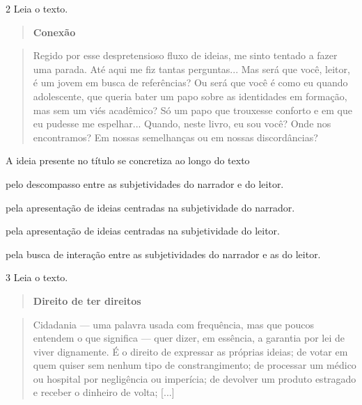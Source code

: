 \pagebreak

\num{2} Leia o texto.

\begin{quote}
\centering\textbf{Conexão}
\end{quote}


\begin{quote}
Regido por esse despretensioso fluxo de ideias, me sinto tentado a fazer
uma parada. Até aqui me fiz tantas perguntas... Mas será que você,
leitor, é um jovem em busca de referências? Ou será que você é como eu
quando adolescente, que queria bater um papo sobre as identidades em
formação, mas sem um viés acadêmico? Só um papo que trouxesse conforto e
em que eu pudesse me espelhar... Quando, neste livro, eu sou você? Onde
nos encontramos? Em nossas semelhanças ou em nossas discordâncias?
\end{quote}



A ideia presente no título se concretiza ao longo do texto

\begin{escolha}
\item pelo descompasso entre as subjetividades do narrador e do leitor.

\item pela apresentação de ideias centradas na subjetividade do narrador.

\item pela apresentação de ideias centradas na subjetividade do leitor.

\item pela busca de interação entre as subjetividades do narrador e as do
leitor.
\end{escolha}

\num{3} Leia o texto.

\begin{quote}
\centering\textbf{Direito de ter direitos}
\end{quote}


\begin{quote}
Cidadania --- uma palavra usada com frequência, mas que poucos entendem
o que significa --- quer dizer, em essência, a garantia por lei de viver
dignamente. É o direito de expressar as próprias ideias; de votar em
quem quiser sem nenhum tipo de constrangimento; de processar um médico
ou hospital por negligência ou imperícia; de devolver um produto
estragado e receber o dinheiro de volta; {[}...{]}
\end{quote}

